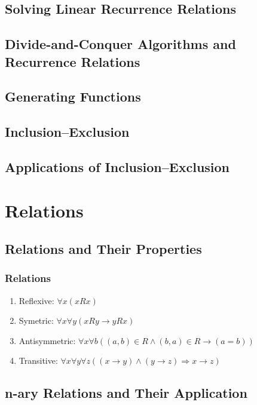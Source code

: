 \documentclass{article}
\begin{document}
\subsection{Solving Linear Recurrence Relations}
\subsection{Divide-and-Conquer Algorithms and Recurrence Relations}
\subsection{Generating Functions}
\subsection{Inclusion–Exclusion}
\subsection{Applications of Inclusion–Exclusion}

\section{Relations}

\subsection{Relations and Their Properties}

\subsubsection{Relations}%
\label{ssub:}

\begin{enumerate}
    \item Reflexive: $ \forall x (xRx) $
    \item Symetric: $ \forall x \forall y (xRy \rightarrow yRx)$
    \item Antisymmetric: $ \forall x \forall b ((a,b) \in R \land
	(b,a) \in R \rightarrow (a=b))$
    \item Transitive: $ \forall x \forall y \forall z
	((x \rightarrow y) \land (y \rightarrow z) \Longrightarrow
	x \rightarrow z) $
\end{enumerate}


\subsection{n-ary Relations and Their Application}
\end{document}
